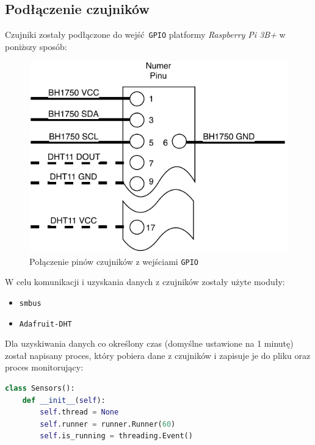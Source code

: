 \subsection{Podłączenie czujników}
Czujniki zostały podłączone do wejść \texttt{GPIO} platformy
\textsl{Raspberry Pi 3B+} w poniższy sposób:
\begin{figure}[h!]
  \centering
  \includegraphics[scale=1]{pins.pdf}
  \caption{Połączenie pinów czujników z wejściami \texttt{GPIO}}
\end{figure}

W celu komunikacji i uzyskania danych z czujników zostały użyte moduły:
\begin{itemize}
  \item \texttt{smbus}
  \item \texttt{Adafruit-DHT}
\end{itemize}

\newpage
Dla uzyskiwania danych co określony czas (domyślne ustawione na 1 minutę) został
napisany proces, który pobiera dane z czujników i zapisuje je do pliku oraz 
proces monitorujący:
\begin{lstlisting}[frame=single, basicstyle=\ttfamily\small, language=python,
caption={Definicja objektu nadzorującego proces zbierający dane}]
class Sensors():
    def __init__(self):
        self.thread = None
        self.runner = runner.Runner(60)
        self.is_running = threading.Event()
\end{lstlisting}

